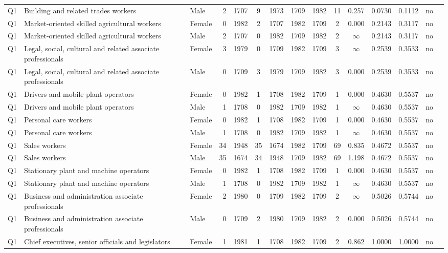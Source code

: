\begin{longtable}{lllrcccccccccll}
Q1 & Building and related trades workers & Male & 2 & 1707 & 9 & 1973 & 1709 & 1982 & 11 & 0.257 & 0.0730 & 0.1112 & no \\
Q1 & Market-oriented skilled agricultural workers & Female & 0 & 1982 & 2 & 1707 & 1982 & 1709 & 2 & 0.000 & 0.2143 & 0.3117 & no \\
Q1 & Market-oriented skilled agricultural workers & Male & 2 & 1707 & 0 & 1982 & 1709 & 1982 & 2 & $\infty$ & 0.2143 & 0.3117 & no \\
Q1 & Legal, social, cultural and related associate professionals & Female & 3 & 1979 & 0 & 1709 & 1982 & 1709 & 3 & $\infty$ & 0.2539 & 0.3533 & no \\
Q1 & Legal, social, cultural and related associate professionals & Male & 0 & 1709 & 3 & 1979 & 1709 & 1982 & 3 & 0.000 & 0.2539 & 0.3533 & no \\
Q1 & Drivers and mobile plant operators & Female & 0 & 1982 & 1 & 1708 & 1982 & 1709 & 1 & 0.000 & 0.4630 & 0.5537 & no \\
Q1 & Drivers and mobile plant operators & Male & 1 & 1708 & 0 & 1982 & 1709 & 1982 & 1 & $\infty$ & 0.4630 & 0.5537 & no \\
Q1 & Personal care workers & Female & 0 & 1982 & 1 & 1708 & 1982 & 1709 & 1 & 0.000 & 0.4630 & 0.5537 & no \\
Q1 & Personal care workers & Male & 1 & 1708 & 0 & 1982 & 1709 & 1982 & 1 & $\infty$ & 0.4630 & 0.5537 & no \\
Q1 & Sales workers & Female & 34 & 1948 & 35 & 1674 & 1982 & 1709 & 69 & 0.835 & 0.4672 & 0.5537 & no \\
Q1 & Sales workers & Male & 35 & 1674 & 34 & 1948 & 1709 & 1982 & 69 & 1.198 & 0.4672 & 0.5537 & no \\
Q1 & Stationary plant and machine operators & Female & 0 & 1982 & 1 & 1708 & 1982 & 1709 & 1 & 0.000 & 0.4630 & 0.5537 & no \\
Q1 & Stationary plant and machine operators & Male & 1 & 1708 & 0 & 1982 & 1709 & 1982 & 1 & $\infty$ & 0.4630 & 0.5537 & no \\
Q1 & Business and administration associate professionals & Female & 2 & 1980 & 0 & 1709 & 1982 & 1709 & 2 & $\infty$ & 0.5026 & 0.5744 & no \\
Q1 & Business and administration associate professionals & Male & 0 & 1709 & 2 & 1980 & 1709 & 1982 & 2 & 0.000 & 0.5026 & 0.5744 & no \\
Q1 & Chief executives, senior officials and legislators & Female & 1 & 1981 & 1 & 1708 & 1982 & 1709 & 2 & 0.862 & 1.0000 & 1.0000 & no \\

\end{longtable}
